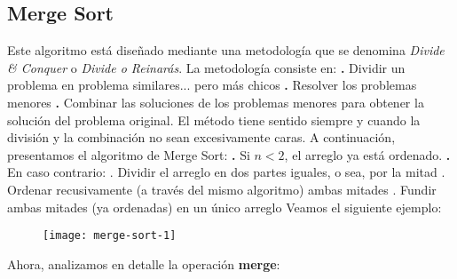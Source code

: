 \documentclass[10pt,a4paper]{article}
\begin{document}
\subsection{Merge Sort}

Este algoritmo está diseñado mediante una metodología que se denomina \textit{Divide \& Conquer} o \textit{Divide o Reinarás}.   
\newline
\newline
La metodología consiste en:
\newline
\newline
\textbf{.} Dividir un problema en problema similares... pero más chicos 
\newline
\newline
\textbf{.} Resolver los problemas menores
\newline
\newline
\textbf{.} Combinar las soluciones de los problemas menores para obtener la solución del problema original.
\newline
\newline
El método tiene sentido siempre y cuando la división y la combinación no sean excesivamente caras.
\newline
\newline
A continuación, presentamos el algoritmo de Merge Sort:
\newline
\newline
\textbf{.} Si $n < 2$, el arreglo ya está ordenado.
\newline
\newline
\textbf{.} En caso contrario:
\newline
{}. Dividir el arreglo en dos partes iguales, o sea, por la mitad
\newline
{}. Ordenar recusivamente (a través del mismo algoritmo) ambas mitades
\newline
{}. Fundir ambas mitades (ya ordenadas) en un único arreglo
\newline
\newline
Veamos el siguiente ejemplo:
\newline
\newline
\begin{figure}[h]
	\centering
\texttt{[image: merge-sort-1]}
	\label{drivers1}
\end{figure}
\newpage
Ahora, analizamos en detalle la operación \textbf{merge}:
\end{document}

